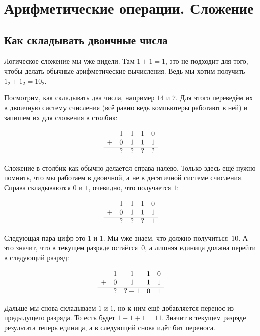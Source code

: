 \chapter{Арифметические операции. Сложение}

\section{Как складывать двоичные числа}

Логическое сложение мы уже видели. Там $1+1=1$, это не подходит для того,
чтобы делать обычные арифметические вычисления. Ведь мы хотим получить
$1_2+1_2=10_2$.

Посмотрим, как складывать два числа, например $14$ и $7$.
Для этого переведём их в двоичную систему счисления (всё равно ведь компьютеры работают в ней)
и запишем их для сложения в столбик:

$$
\begin{array}{ccccc}
  & 1 & 1 & 1 & 0 \\
+ & 0 & 1 & 1 & 1 \\ \hline
  & ? & ? & ? & ? \\
\end{array}
$$

Сложение в столбик как обычно делается справа налево. Только здесь ещё нужно помнить,
что мы работаем в двоичной, а не в десятичной системе счисления.
Справа складываются $0$ и $1$, очевидно, что получается $1$:

$$
\begin{array}{ccccc}
  & 1 & 1 & 1 & 0 \\
+ & 0 & 1 & 1 & 1 \\ \hline
  & ? & ? & ? & 1 \\
\end{array}
$$

Следующая пара цифр это $1$ и $1$. Мы уже знаем, что должно получиться~$10$.
А это значит, что в текущем разряде остаётся~$0$, а лишняя единица должна перейти
в следующий разряд:

$$
\begin{array}{ccccc}
  & 1 & 1 & 1 & 0 \\
+ & 0 & 1 & 1 & 1 \\ \hline
  & ? & ?+1 & 0 & 1 \\
\end{array}
$$

Дальше мы снова складываем $1$ и $1$, но к ним ещё добавляется перенос из предыдущего разряда.
То есть будет $1+1+1=11$. Значит в текущем разряде результата теперь единица,
а в следующий снова идёт бит переноса.

